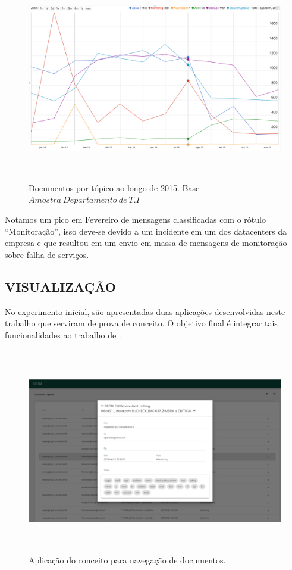 \documentclass[12pt,a4paper]{article}
\begin{document}
\begin{figure}[H]
	\centering
    \includegraphics[height=9cm]{images/figure_7.png}
    \caption{Documentos por tópico ao longo de 2015. Base $Amostra\ Departamento\ de\ T.I$}
    \label{fig-documents-over-2015}
\end{figure}
 
Notamos um pico em Fevereiro de mensagens classificadas
 com o rótulo ``Monitoração'', isso deve-se devido a um incidente em um dos datacenters da empresa e que resultou em
 um envio em massa de mensagens de monitoração sobre falha de serviços.

\subsection{VISUALIZAÇÃO} \label{sec:visualizacao}

No experimento inicial, são apresentadas duas aplicações desenvolvidas neste trabalho que serviram de prova de conceito.
 O objetivo final é integrar tais funcionalidades ao trabalho de .

\begin{figure}[H]
  \centering
  \includegraphics[height=9cm]{images/figure_8.png}
  \caption{Aplicação do conceito para navegação de documentos.}
  \label{fig-doc-explorer}
\end{figure}
\end{document}
